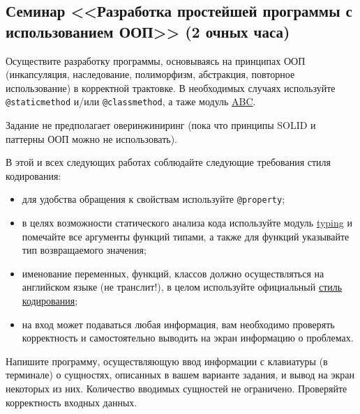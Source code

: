 \subsection{Семинар <<Разработка простейшей программы с использованием ООП>> 
(2 очных часа)}

Осуществите разработку программы, основываясь на принципах ООП (инкапсуляция, наследование,
полиморфизм, абстракция, повторное использование) в корректной трактовке. 
В необходимых случаях используйте \verb|@staticmethod| и/или \verb|@classmethod|, 
а таже модуль \href{https://pypi.org/project/ABC/}{ABC}.

Задание не предполагает оверинжиниринг (пока что принципы SOLID и паттерны ООП можно
не использовать).

В этой и всех следующих работах соблюдайте следующие требования стиля кодирования:

\begin{itemize}
    \item для удобства обращения к свойствам используйте \verb|@property|;
    \item в целях возможности статического анализа кода используйте модуль
    \href{https://pypi.org/project/typing/}{typing} и помечайте все аргументы функций
    типами, а также для функций указывайте тип возвращаемого значения; 
    \item именование переменных, функций, классов должно осуществляться на английском 
    языке (не транслит!), в целом используйте официальный 
    \href{https://peps.python.org/pep-0008/}{стиль кодирования};
    \item на вход может подаваться любая информация, вам необходимо проверять корректность
    и самостоятельно выводить на экран информацию о проблемах.
\end{itemize}

Напишите программу, осуществляющую ввод информации с клавиатуры (в терминале) 
о сущностях, 
описанных в вашем варианте задания, и вывод на экран
некоторых из них. Количество вводимых сущностей не ограничено.
Проверяйте корректность входных данных. 

